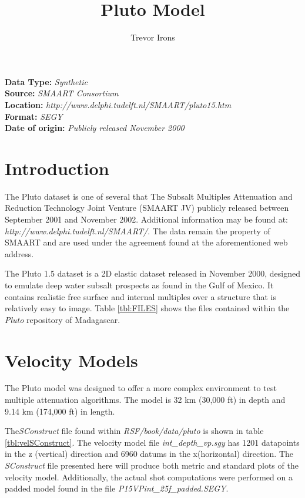 \title{Pluto Model}
\author{Trevor Irons}

\maketitle
\lstset{language=python,numbers=left,numberstyle=\tiny,showstringspaces=false}
\textbf {Data Type:} \emph{Synthetic}\\
\textbf {Source:} \emph{SMAART Consortium}\\
\textbf {Location:} \emph{http://www.delphi.tudelft.nl/SMAART/pluto15.htm}\\
\textbf {Format:} \emph{SEGY} \\
\textbf{Date of origin:} \emph{Publicly released November 2000}\\

\section{Introduction} 
The Pluto dataset is one of several that The Subsalt Multiples Attenuation and Reduction Technology Joint Venture (SMAART JV) publicly released between September 2001 and November 2002.  Additional information may be found at:\\ \emph{http://www.delphi.tudelft.nl/SMAART/}.  The data remain the property of SMAART and are used under the agreement found at the aforementioned web address.

The Pluto 1.5 dataset is a 2D elastic dataset released in November 2000, designed to emulate deep water subsalt prospects as found in the Gulf of Mexico. It contains realistic free surface and internal multiples over a structure that is relatively easy to image. Table \ref{tbl:FILES} shows the files contained within the \emph{Pluto} repository of Madagascar.  
 
{
\tiny

\normalsize
}

\section{Velocity Models}
The Pluto model was designed to offer a more complex environment to test multiple attenuation algorithms.  The model is 32 km (30,000 ft) in depth and 9.14 km (174,000 ft) in length.  

The\emph{SConstruct} file found within \emph{RSF/book/data/pluto} is shown in table \ref{tbl:velSConstruct}.  The velocity model file \textit{int\_depth\_vp.sgy} has 1201 datapoints in the z (vertical) direction and 6960 datums in the x(horizontal) direction. The \emph{SConstruct} file presented here will produce both metric and standard plots of the velocity model.  Additionally, the actual shot computations were performed on a padded model found in the file \emph{P15VPint\_25f\_padded.SEGY}.     

